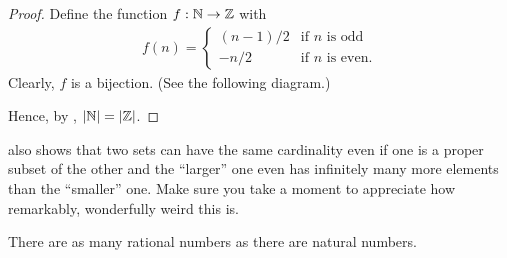 \documentclass[11pt,twoside=off,numbers=noenddot]{scrbook}
\begin{document}
\begin{proof}
  Define the function $f : \mathbb N \to \mathbb Z$ with
  \begin{align*}
    f(n) =
    \begin{cases}
      (n - 1) / 2 & \text{if $n$ is odd} \\
      - n / 2 & \text{if $n$ is even}.
    \end{cases}
  \end{align*}
  Clearly, $f$ is a bijection. (See the following diagram.)

  \begin{tightfigure}
    \centering
  \end{tightfigure}

  Hence, by , $| \mathbb N | = | \mathbb Z |$.
\end{proof}

\begin{remark}
   also shows that two sets can have
  the same cardinality even if one is a proper subset of the other
  and the ``larger'' one even has infinitely many more elements than
  the ``smaller'' one. Make sure you take a moment to appreciate how
  remarkably, wonderfully weird this is.
\end{remark}

\begin{theorem}[$\abs{\QQ} = \abs{\NN}$]
  There are as many rational numbers as there are natural numbers.
\end{theorem}
\end{document}
